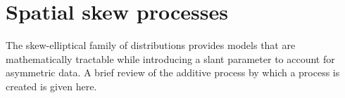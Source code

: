 

\section{Spatial skew processes}\label{sts:spatialskew}
The skew-elliptical family of distributions provides models that are mathematically tractable while introducing a slant parameter to account for asymmetric data.
A brief review of the additive process \citep[p. 129]{Azzalini2014} by which a \skewt process is created is given here.

